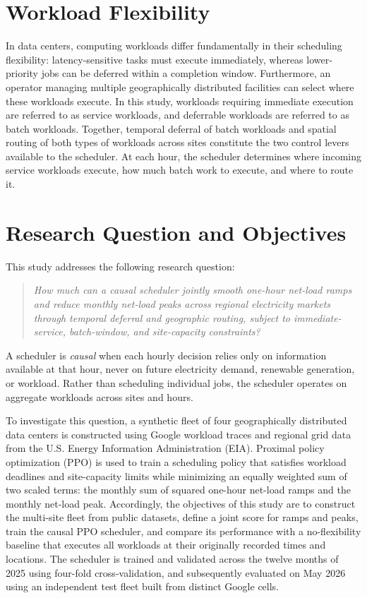 \documentclass{UNCC-thesis}
\begin{document}
\section{Workload Flexibility}
\label{sec:intro-flexibility}

In data centers, computing workloads differ fundamentally in their scheduling flexibility:
latency-sensitive tasks must execute immediately, whereas lower-priority jobs can be deferred
within a completion window. Furthermore, an operator managing multiple geographically
distributed facilities can select where these workloads execute. In this study, workloads
requiring immediate execution are referred to as service workloads, and deferrable workloads are
referred to as batch workloads. Together, temporal deferral of batch workloads and spatial
routing of both types of workloads across sites constitute the two control levers available to
the scheduler. At each hour, the scheduler determines where incoming service workloads execute,
how much batch work to execute, and where to route it.

\section{Research Question and Objectives}
\label{sec:intro-questions}

This study addresses the following research question:
\begin{quote}
\emph{How much can a causal scheduler jointly smooth one-hour net-load ramps and reduce monthly
net-load peaks across regional electricity markets through temporal deferral and geographic
routing, subject to immediate-service, batch-window, and site-capacity constraints?}
\end{quote}

A scheduler is \emph{causal} when each hourly decision relies only on information
available at that hour, never on future electricity demand, renewable generation, or workload.
Rather than scheduling individual jobs, the scheduler operates on aggregate workloads across
sites and hours.

To investigate this question, a synthetic fleet of four geographically distributed data centers
is constructed using Google workload traces and regional grid data from the U.S. Energy
Information Administration (EIA). Proximal policy optimization (PPO) is used to train a
scheduling policy that satisfies workload deadlines and site-capacity limits while minimizing an
equally weighted sum of two scaled terms: the monthly sum of squared one-hour net-load ramps and
the monthly net-load peak. Accordingly, the objectives of this study are to construct the
multi-site fleet from public datasets, define a joint score for ramps and peaks, train the causal
PPO scheduler, and compare its performance with a no-flexibility baseline that executes all
workloads at their originally recorded times and locations.
The scheduler is trained and validated across the twelve months of 2025 using four-fold
cross-validation, and subsequently evaluated on May 2026 using an independent test fleet built
from distinct Google cells.
\end{document}

